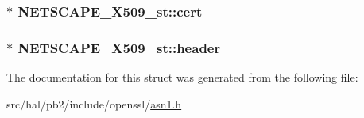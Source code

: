 \subsubsection[{\texorpdfstring{cert}{cert}}]{$\ast$ N\+E\+T\+S\+C\+A\+P\+E\+\_\+\+X509\+\_\+st\+::cert}\hypertarget{struct_n_e_t_s_c_a_p_e___x509__st_ae73d9f6791b788f7c724b89f715d3d76}{}\label{struct_n_e_t_s_c_a_p_e___x509__st_ae73d9f6791b788f7c724b89f715d3d76}
\subsubsection[{\texorpdfstring{header}{header}}]{$\ast$ N\+E\+T\+S\+C\+A\+P\+E\+\_\+\+X509\+\_\+st\+::header}\hypertarget{struct_n_e_t_s_c_a_p_e___x509__st_a00f5f31a882f9ee420d1a3bd2beebedd}{}\label{struct_n_e_t_s_c_a_p_e___x509__st_a00f5f31a882f9ee420d1a3bd2beebedd}


The documentation for this struct was generated from the following file\+:\begin{DoxyCompactItemize}
\item 
src/hal/pb2/include/openssl/\hyperlink{asn1_8h}{asn1.\+h}\end{DoxyCompactItemize}
